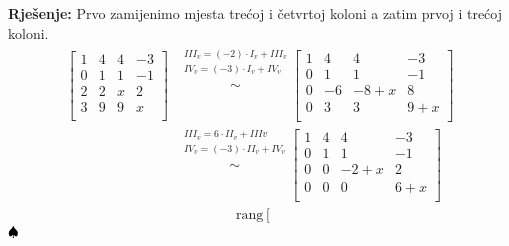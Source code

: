 \documentclass{article}
\newenvironment{solution}{\noindent\textbf{Rje\v senje:\newline}}{$\hfill\spadesuit$}
\begin{document}
\begin{solution}
    Prvo zamijenimo mjesta tre\' coj i \v cetvrtoj koloni a zatim prvoj i tre\' coj koloni.
    \begin{equation}
        \label{eq:4}
        \begin{aligned}
            \left[
        \begin{array}{cccc}
            1 & 4 & 4 & -3 \\
            0 & 1 & 1 & -1 \\
            2 & 2 & x & 2 \\
            3 & 9 & 9 & x \\
        \end{array}
        \right] &\overset{\begin{array}{c}
            III_v=(-2)\cdot I_v+III_v \\
            IV_v=(-3)\cdot I_v+IV_v \\
        \end{array}}{\sim}\left[
            \begin{array}{cccc}
                1 & 4 & 4 & -3 \\
                0 & 1 & 1 & -1 \\
                0 & -6 & -8+x & 8 \\
                0 & 3 & 3 & 9+x \\
            \end{array}
        \right]\\
        &\overset{\begin{array}{c}
            III_v=6\cdot II_v+IIIv \\
            IV_v=(-3)\cdot II_v+IV_v \\
        \end{array}}{\sim}\left[
            \begin{array}{cccc}
                1 & 4 & 4 & -3 \\
                0 & 1 & 1 & -1 \\
                0 & 0 & -2+x & 2 \\
                0 & 0 & 0 & 6+x \\
            \end{array}
        \right]
        \end{aligned}
    \end{equation}
    \begin{equation*}
        \begin{aligned}
            \text{rang}\left[
            \begin{array}{cccc}

\end{array}
\end{aligned}
\end{equation*}
\end{solution}
\end{document}
